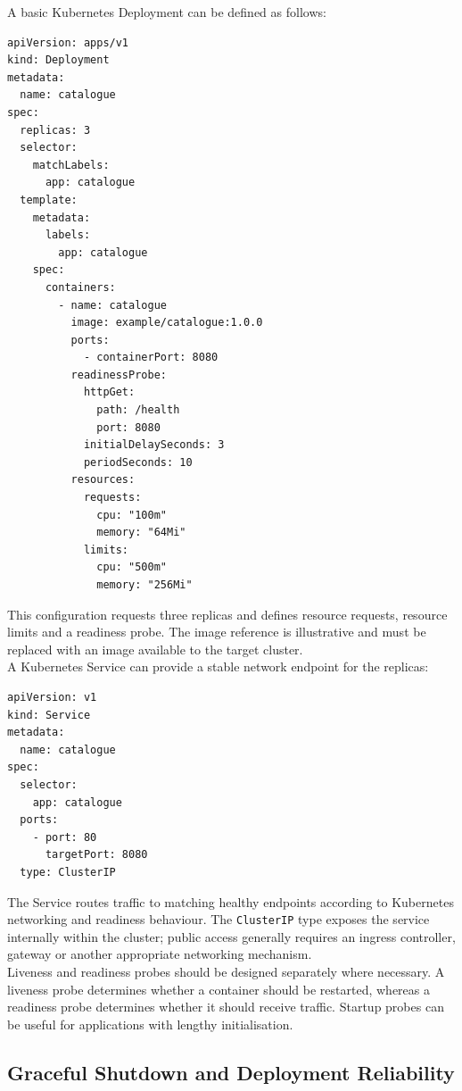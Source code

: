 A basic Kubernetes Deployment can be defined as follows:

\begin{lstlisting}
apiVersion: apps/v1
kind: Deployment
metadata:
  name: catalogue
spec:
  replicas: 3
  selector:
    matchLabels:
      app: catalogue
  template:
    metadata:
      labels:
        app: catalogue
    spec:
      containers:
        - name: catalogue
          image: example/catalogue:1.0.0
          ports:
            - containerPort: 8080
          readinessProbe:
            httpGet:
              path: /health
              port: 8080
            initialDelaySeconds: 3
            periodSeconds: 10
          resources:
            requests:
              cpu: "100m"
              memory: "64Mi"
            limits:
              cpu: "500m"
              memory: "256Mi"
\end{lstlisting}

This configuration requests three replicas and defines resource requests, resource limits and a readiness probe. The image reference is illustrative and must be replaced with an image available to the target cluster.\\

A Kubernetes Service can provide a stable network endpoint for the replicas:

\begin{lstlisting}
apiVersion: v1
kind: Service
metadata:
  name: catalogue
spec:
  selector:
    app: catalogue
  ports:
    - port: 80
      targetPort: 8080
  type: ClusterIP
\end{lstlisting}

The Service routes traffic to matching healthy endpoints according to Kubernetes networking and readiness behaviour. The \texttt{ClusterIP} type exposes the service internally within the cluster; public access generally requires an ingress controller, gateway or another appropriate networking mechanism.\\

Liveness and readiness probes should be designed separately where necessary. A liveness probe determines whether a container should be restarted, whereas a readiness probe determines whether it should receive traffic. Startup probes can be useful for applications with lengthy initialisation.

\subsection{Graceful Shutdown and Deployment Reliability}

